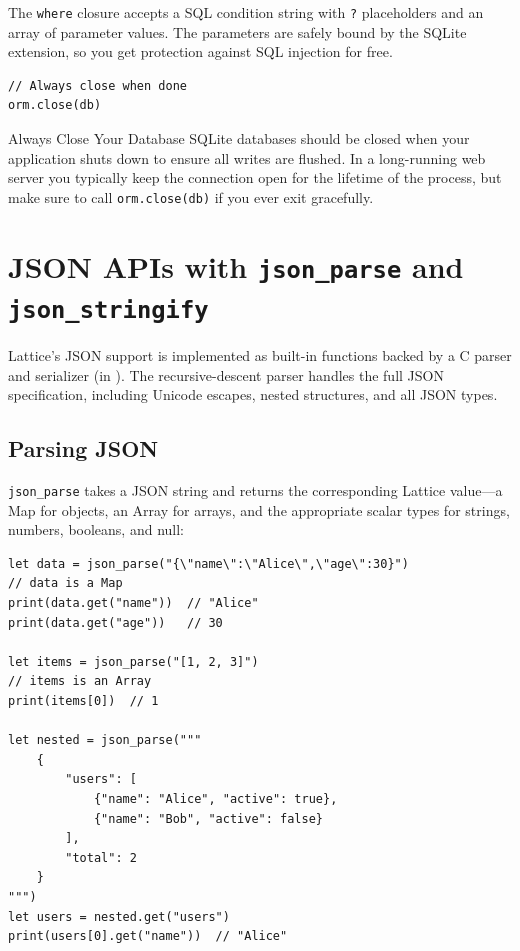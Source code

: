 The \lstinline|where| closure accepts a SQL condition string with \lstinline|?| placeholders and an array of parameter values.
The parameters are safely bound by the SQLite extension, so you get protection against SQL injection for free.

\begin{lstlisting}[language=Lattice, caption={Closing the database}]
// Always close when done
orm.close(db)
\end{lstlisting}

\begin{warnbox}{Always Close Your Database}
SQLite databases should be closed when your application shuts down to ensure all writes are flushed.
In a long-running web server you typically keep the connection open for the lifetime of the process, but make sure to call \lstinline|orm.close(db)| if you ever exit gracefully.
\end{warnbox}

\section{JSON APIs with \texttt{json\_parse} and \texttt{json\_stringify}}\label{sec:json-apis}


Lattice's JSON support is implemented as built-in functions backed by a C parser and serializer (in ).
The recursive-descent parser handles the full JSON specification, including Unicode escapes, nested structures, and all JSON types.

\subsection{Parsing JSON}\label{sec:json-parsing}

\lstinline|json_parse| takes a JSON string and returns the corresponding Lattice value---a Map for objects, an Array for arrays, and the appropriate scalar types for strings, numbers, booleans, and null:

\begin{lstlisting}[language=Lattice, caption={Parsing JSON strings}]
let data = json_parse("{\"name\":\"Alice\",\"age\":30}")
// data is a Map
print(data.get("name"))  // "Alice"
print(data.get("age"))   // 30

let items = json_parse("[1, 2, 3]")
// items is an Array
print(items[0])  // 1

let nested = json_parse("""
    {
        "users": [
            {"name": "Alice", "active": true},
            {"name": "Bob", "active": false}
        ],
        "total": 2
    }
""")
let users = nested.get("users")
print(users[0].get("name"))  // "Alice"
\end{lstlisting}

